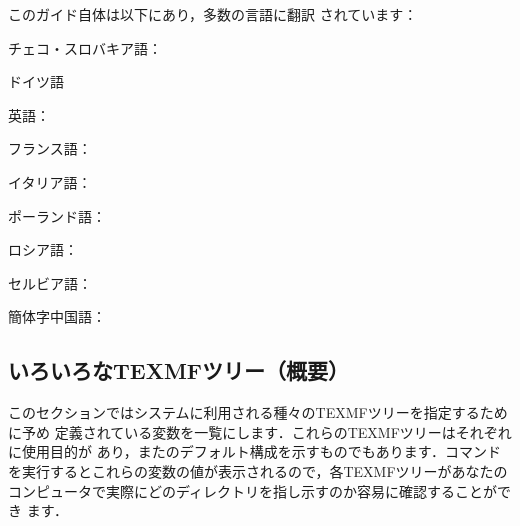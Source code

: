 \documentclass[uplatex,dvipdfmx,tombow]{jsarticle}
\begin{document}
この\TL ガイド自体は以下にあり，多数の言語に翻訳
されています：

\begin{itemize*}
\item チェコ・スロバキア語：
\item ドイツ語
\item 英語：
\item フランス語：
\item イタリア語：
\item ポーランド語：
\item ロシア語：
\item セルビア語：
\item 簡体字中国語：
\end{itemize*}

\subsection{いろいろなTEXMFツリー（概要）}
\label{sec:texmftrees}

このセクションではシステムに利用される種々のTEXMFツリーを指定するために予め
定義されている変数を一覧にします．これらのTEXMFツリーはそれぞれに使用目的が
あり，また\TL のデフォルト構成を示すものでもあります．コマンドを実行するとこれらの変数の値が表示されるので，各TEXMFツリーがあなたの
コンピュータで実際にどのディレクトリを指し示すのか容易に確認することができ
ます．
\end{document}
